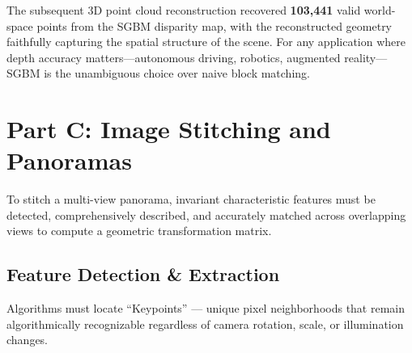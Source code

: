 \documentclass[a4paper,12pt]{article}
\begin{document}
The subsequent 3D point cloud reconstruction recovered \textbf{103,441} valid world-space points from the SGBM disparity map, with the reconstructed geometry faithfully capturing the spatial structure of the scene. For any application where depth accuracy matters---autonomous driving, robotics, augmented reality---SGBM is the unambiguous choice over naive block matching.

\section{Part C: Image Stitching and Panoramas}

To stitch a multi-view panorama, invariant characteristic features must be detected, comprehensively described, and accurately matched across overlapping views to compute a geometric transformation matrix.

\subsection{Feature Detection \& Extraction}

Algorithms must locate ``Keypoints'' --- unique pixel neighborhoods that remain algorithmically recognizable regardless of camera rotation, scale, or illumination changes.
\end{document}
